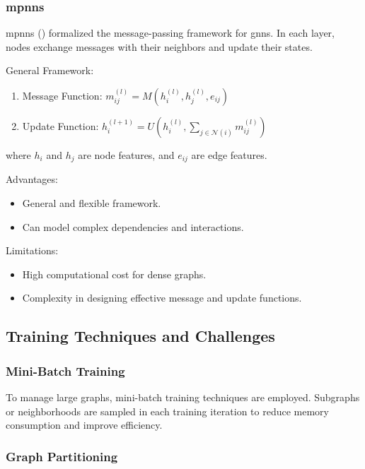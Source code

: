\subsubsection*{\glspl{mpnn}}

\glspl{mpnn} (\cite{Gilmer2017}) formalized the message-passing framework for \glspl{gnn}. In each layer, nodes exchange messages with their neighbors and update their states.

General Framework:

\begin{enumerate}
    \item Message Function: \( m_{ij}^{(l)} = M(h_i^{(l)}, h_j^{(l)}, e_{ij}) \)
    \item Update Function: \( h_i^{(l+1)} = U\left(h_i^{(l)}, \sum_{j \in \mathcal{N}(i)} m_{ij}^{(l)}\right) \)
\end{enumerate}

where \( h_i \) and \( h_j \) are node features, and \( e_{ij} \) are edge features.

Advantages:
\begin{itemize}
    \item General and flexible framework.
    \item Can model complex dependencies and interactions.
\end{itemize}


Limitations:
\begin{itemize}
    \item High computational cost for dense graphs.
    \item Complexity in designing effective message and update functions.
\end{itemize}

\subsection*{Training Techniques and Challenges}

\subsubsection*{Mini-Batch Training}

To manage large graphs, mini-batch training techniques are employed. Subgraphs or neighborhoods are sampled in each training iteration to reduce memory consumption and improve efficiency.

\subsubsection*{Graph Partitioning}

